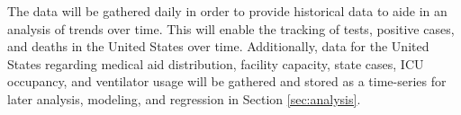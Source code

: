 \documentclass[11pt]{article}
\newcommand{\comment}[1]{{\color{red}{#1}}}
\begin{document}
\noindent
The data will be gathered daily in order to provide historical data to aide in an analysis of trends over time. This will enable the tracking of tests, positive cases, and deaths in the United States over time. Additionally, data for the United States regarding medical aid distribution, facility capacity, state cases, ICU occupancy, and ventilator usage will be gathered and stored as a time-series for later analysis, modeling, and regression in Section \ref{sec:analysis}.








\end{document}
